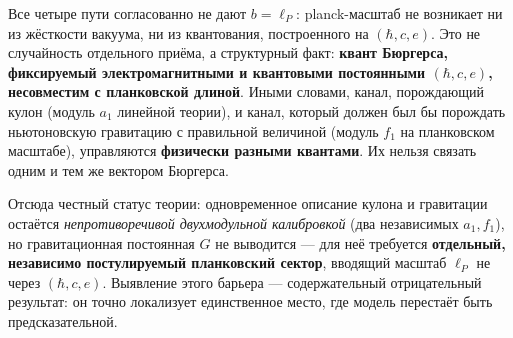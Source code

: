 Все четыре пути согласованно не дают $b=\ell_P$: planck-масштаб не
возникает ни из жёсткости вакуума, ни из квантования, построенного на
$(\hbar,c,e)$. Это не случайность отдельного приёма, а структурный факт:
\textbf{квант Бюргерса, фиксируемый электромагнитными и квантовыми
постоянными $(\hbar,c,e)$, несовместим с планковской длиной}. Иными
словами, канал, порождающий кулон (модуль $a_1$ линейной теории), и
канал, который должен был бы порождать ньютоновскую гравитацию с
правильной величиной (модуль $f_1$ на планковском масштабе), управляются
\textbf{физически разными квантами}. Их нельзя связать одним и тем же
вектором Бюргерса.

Отсюда честный статус теории: одновременное описание кулона и гравитации
остаётся \emph{непротиворечивой двухмодульной калибровкой} (два
независимых $a_1,f_1$), но гравитационная постоянная $G$ не выводится ---
для неё требуется \textbf{отдельный, независимо постулируемый планковский
сектор}, вводящий масштаб $\ell_P$ не через $(\hbar,c,e)$. Выявление
этого барьера --- содержательный отрицательный результат: он точно
локализует единственное место, где модель перестаёт быть предсказательной.
